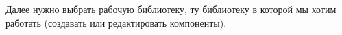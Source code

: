 \bigskip
Далее нужно выбрать рабочую библиотеку, ту библиотеку в которой мы
хотим работать (создавать или редактировать компоненты).
% 
% 
% 
% 
% 
% 
% 
% 
% 
% 
% 
% 
% 
% 
% 
% 
% 
% 
% 
% 
% 
% 
% 
% 
% 
% 
% 
% 
% 
% 
% 
% 
% 
% 
% 

\secup

